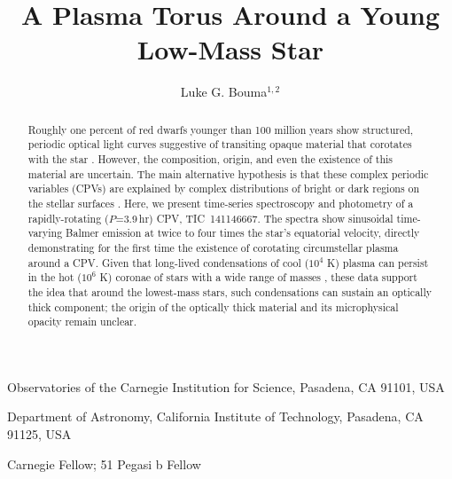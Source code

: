 \documentclass{nature3}
\title{A Plasma Torus Around a Young Low-Mass Star}
\newcommand{\carnegie}{Observatories of the Carnegie Institution for Science, Pasadena, CA 91101, USA}
\newcommand{\caltech}{Department of Astronomy, California Institute of Technology, Pasadena, CA 91125, USA}
\begin{document}
\author{Luke G. Bouma$^{1,2}$}

\maketitle

\scriptsize
\begin{affiliations}
\item \carnegie
\item \caltech
\item Carnegie Fellow; 51 Pegasi b Fellow
\end{affiliations}
\normalsize


\begin{abstract}
\normalfont
Roughly one percent of red dwarfs younger than 100 million years show
structured, periodic optical light curves suggestive of transiting
opaque material that corotates with the star
\cite{Rebull2016,Stauffer2017,Rebull2018,Bouma2024}.  However, the
composition, origin, and even the existence of this material are
uncertain. The main alternative hypothesis is that these complex
periodic variables (CPVs) are explained by complex distributions of
bright or dark regions on the stellar surfaces \cite{Koen2021}.
Here, we present time-series spectroscopy and photometry of a
rapidly-rotating ($P$=3.9\,hr) CPV, TIC~141146667. The spectra show
sinusoidal time-varying Balmer emission at twice to four times the
star's equatorial velocity, directly demonstrating for the first
time the existence of corotating circumstellar plasma around a CPV.
Given that long-lived condensations of cool ($10^4$ K) plasma can
persist in the hot ($10^6$ K) coronae of stars with a wide range of
masses \cite{CollierCameron1989,Townsend2005,Dunstone2006,Petit2013,Waugh2022,Daley-Yates2024},
these data support the idea that around the lowest-mass stars, such
condensations can sustain an optically thick component; the origin
of the optically thick material and its microphysical opacity remain
unclear.
\end{abstract}

\maketitle

\end{document}
